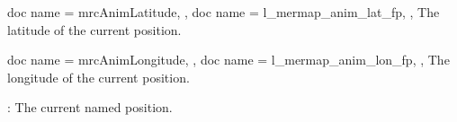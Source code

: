 \begin{docCommands}[
    doc new     = 2023-07-31,
  ]{
    {
      doc name        = mrcAnimLatitude,
    },
    {
      doc name        = l_mermap_anim_lat_fp,
    },
  }
  The latitude of the current position.
\end{docCommands}



\begin{docCommands}[
    doc new     = 2023-07-31,
  ]{
    {
      doc name        = mrcAnimLongitude,
    },
    {
      doc name        = l_mermap_anim_lon_fp,
    },
  }
  The longitude of the current position.
\end{docCommands}


:
  The current named position.




